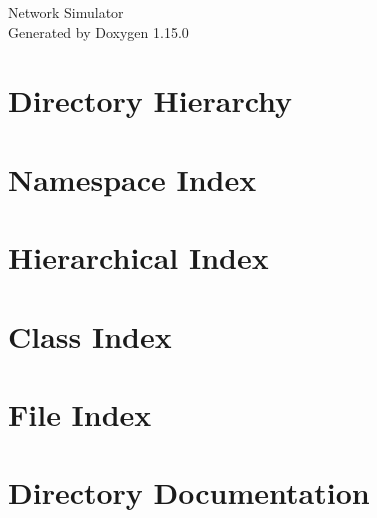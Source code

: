 \documentclass[twoside]{book}
\newcommand{\+}{\discretionary{\mbox{\scriptsize$\hookleftarrow$}}{}{}}
\newcommand{\clearemptydoublepage}{%
    \newpage{\pagestyle{empty}\cleardoublepage}%
  }
\begin{document}
  \raggedbottom
    \hypersetup{pageanchor=false,
                bookmarksnumbered=true,
                pdfencoding=unicode
               }
  \begin{titlepage}
  \vspace*{7cm}
  \begin{center}%
  {\Large Network Simulator}\\
  \vspace*{1cm}
  {\large Generated by Doxygen 1.15.0}\\
  \end{center}
  \end{titlepage}
  \clearemptydoublepage
  \tableofcontents
  \clearemptydoublepage
  \hypersetup{pageanchor=true}
\chapter{Directory Hierarchy}

\chapter{Namespace Index}

\chapter{Hierarchical Index}

\chapter{Class Index}

\chapter{File Index}

\chapter{Directory Documentation}

















\end{document}

